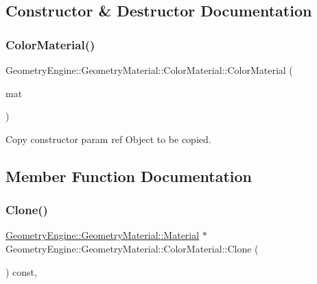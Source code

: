 \subsection{Constructor \& Destructor Documentation}
\mbox{\label{class_geometry_engine_1_1_geometry_material_1_1_color_material_a42495fe930beb678d0c31a93045572e3}} 
\subsubsection{\texorpdfstring{ColorMaterial()}{ColorMaterial()}}
{\footnotesize\ttfamily Geometry\+Engine\+::\+Geometry\+Material\+::\+Color\+Material\+::\+Color\+Material (\begin{DoxyParamCaption}\item[{const \mbox{\hyperlink{class_geometry_engine_1_1_geometry_material_1_1_color_material}{Color\+Material}} \&}]{mat }\end{DoxyParamCaption})}

Copy constructor param ref Object to be copied. 

\subsection{Member Function Documentation}
\mbox{\label{class_geometry_engine_1_1_geometry_material_1_1_color_material_a29dbf04e76b75fcc86f184d072bba0a5}} 
\subsubsection{\texorpdfstring{Clone()}{Clone()}}
{\footnotesize\ttfamily \mbox{\hyperlink{class_geometry_engine_1_1_geometry_material_1_1_material}{Geometry\+Engine\+::\+Geometry\+Material\+::\+Material}} $\ast$ Geometry\+Engine\+::\+Geometry\+Material\+::\+Color\+Material\+::\+Clone (\begin{DoxyParamCaption}{ }\end{DoxyParamCaption}) const\hspace{0.3cm}{\ttfamily [override]}, {\ttfamily [virtual]}}

